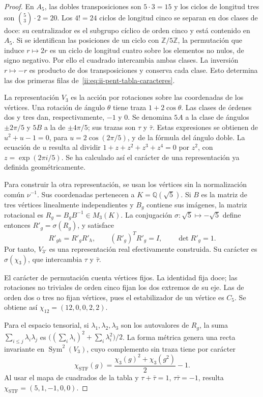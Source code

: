 \begin{proof}
En \(A_5\), las dobles transposiciones son \(5\cdot3=15\) y
los ciclos de longitud tres son \(\binom53\cdot2=20\).
Los \(4!=24\) ciclos de longitud cinco se separan en dos clases de
doce: su centralizador es el subgrupo cíclico de orden cinco y está
contenido en \(A_5\). Si se identifican las posiciones de un ciclo
con \(\mathbb Z/5\mathbb Z\), la permutación que induce
\(r\mapsto2r\) es un ciclo de longitud cuatro sobre los elementos
no nulos, de signo negativo. Por ello el cuadrado intercambia ambas
clases. La inversión \(r\mapsto-r\) es producto de dos
transposiciones y conserva cada clase. Esto determina las dos primeras
filas de~\eqref{ii:eq:ii-pent-tabla-caracteres}.

La representación \(V_3\) es la acción por rotaciones sobre las
coordenadas de los vértices. Una rotación de ángulo \(\theta\)
tiene traza \(1+2\cos\theta\). Las clases de órdenes dos y tres
dan, respectivamente, \(-1\) y \(0\). Se denomina \(5A\) a la
clase de ángulos \(\pm2\pi/5\) y \(5B\) a la de
\(\pm4\pi/5\); sus trazas son \(\tau\) y \(\bar\tau\).
Estas expresiones se obtienen de
\(u^2+u-1=0\), para \(u=2\cos(2\pi/5)\), y de la fórmula
del ángulo doble. La ecuación de \(u\) resulta al dividir
\(1+z+z^2+z^3+z^4=0\) por \(z^2\), con
\(z=\exp(2\pi i/5)\). Se ha calculado así el carácter de una
representación ya definida geométricamente.

Para construir la otra representación, se usan los vértices sin la
normalización común \(\nu^{-1}\). Sus coordenadas pertenecen a
\(K=\mathbb Q(\sqrt5)\). Si \(B\) es la matriz de tres vértices
linealmente independientes y \(B_g\) contiene sus imágenes, la
matriz rotacional es \(R_g=B_gB^{-1}\in M_3(K)\).
La conjugación \(\sigma:\sqrt5\mapsto-\sqrt5\) define entonces
\(R'_g=\sigma(R_g)\), y satisface
\[
 R'_{gh}=R'_gR'_h,\qquad
 (R'_g)^TR'_g=I,\qquad \det R'_g=1.
\]
Por tanto, \(V_{3'}\) es una representación real efectivamente
construida. Su carácter es \(\sigma(\chi_3)\), que intercambia
\(\tau\) y \(\bar\tau\).

El carácter de permutación cuenta vértices fijos. La identidad fija
doce; las rotaciones no triviales de orden cinco fijan los dos extremos
de su eje. Las de orden dos o tres no fijan vértices, pues el
estabilizador de un vértice es \(C_5\). Se obtiene así
\(\chi_{12}=(12,0,0,2,2)\).

Para el espacio tensorial, si \(\lambda_1,\lambda_2,\lambda_3\)
son los autovalores de \(R_g\), la suma
\(\sum_{i\leq j}\lambda_i\lambda_j\) es
\(\bigl((\sum_i\lambda_i)^2+\sum_i\lambda_i^2\bigr)/2\).
La forma métrica genera una recta invariante en
\(\operatorname{Sym}^2(V_3)\), cuyo complemento sin traza tiene
por carácter
\begin{equation}
\label{ii:eq:ii-pent-caracter-stf}
 \chi_{\mathrm{STF}}(g)
 =\frac{\chi_3(g)^2+\chi_3(g^2)}2-1.
\end{equation}
Al usar el mapa de cuadrados de la tabla y
\(\tau+\bar\tau=1\), \(\tau\bar\tau=-1\), resulta
\(\chi_{\mathrm{STF}}=(5,1,-1,0,0)\).


\end{proof}
